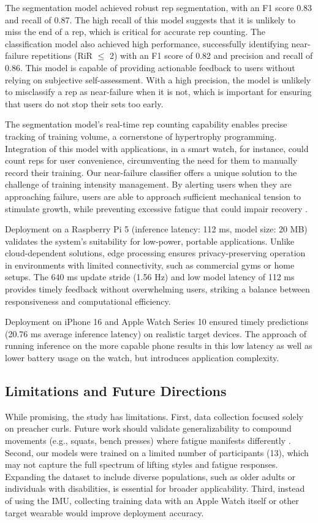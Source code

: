 \documentclass[conference]{IEEEtran}
\begin{document}
The segmentation model achieved robust rep segmentation, with an F1 score 0.83 and recall of 0.87. The high recall of this model suggests that it is unlikely to miss the end of a rep, which is critical for accurate rep counting. The classification model also achieved high performance, successfully identifying near-failure repetitions (RiR $\le$ 2) with an F1 score of 0.82 and precision and recall of 0.86. This model is capable of providing actionable feedback to users without relying on subjective self-assessment. With a high precision, the model is unlikely to misclassify a rep as near-failure when it is not, which is important for ensuring that users do not stop their sets too early.

The segmentation model's real-time rep counting capability enables precise tracking of training volume, a cornerstone of hypertrophy programming. Integration of this model with applications, in a smart watch, for instance, could count reps for user convenience, circumventing the need for them to manually record their training. Our near-failure classifier offers a unique solution to the challenge of training intensity management. By alerting users when they are approaching failure, users are able to approach sufficient mechanical tension to stimulate growth, while preventing excessive fatigue that could impair recovery \cite{izquierdo2006differential}. 

Deployment on a Raspberry Pi 5 (inference latency: 112 ms, model size: 20 MB) validates the system's suitability for low-power, portable applications. Unlike cloud-dependent solutions, edge processing ensures privacy-preserving operation in environments with limited connectivity, such as commercial gyms or home setups. The 640 ms update stride (1.56 Hz) and low model latency of 112 ms provides timely feedback without overwhelming users, striking a balance between responsiveness and computational efficiency.

Deployment on iPhone 16 and Apple Watch Series 10 ensured timely predictions (20.76 ms average inference latency) on realistic target devices. The approach of running inference on the more capable phone results in this low latency as well as lower battery usage on the watch, but introduces application complexity.

\subsection{Limitations and Future Directions}
While promising, the study has limitations. First, data collection focused solely on preacher curls. Future work should validate generalizability to compound movements (e.g., squats, bench presses) where fatigue manifests differently \cite{velloso2013qualitative}. Second, our models were trained on a limited number of participants (13), which may not capture the full spectrum of lifting styles and fatigue responses. Expanding the dataset to include diverse populations, such as older adults or individuals with disabilities, is essential for broader applicability. Third, instead of using the IMU, collecting training data with an Apple Watch itself or other target wearable would improve deployment accuracy.
\end{document}
